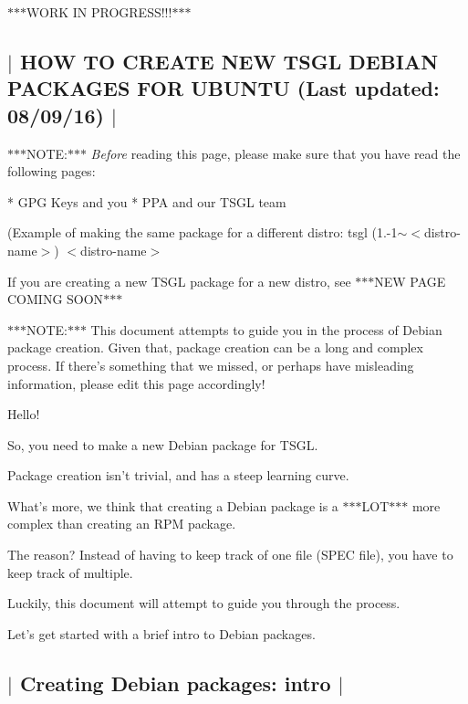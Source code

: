 $\ast$$\ast$$\ast$\-W\-O\-R\-K I\-N P\-R\-O\-G\-R\-E\-S\-S!!!$\ast$$\ast$$\ast$ 

 \subsection*{$\vert$ H\-O\-W T\-O C\-R\-E\-A\-T\-E N\-E\-W T\-S\-G\-L D\-E\-B\-I\-A\-N P\-A\-C\-K\-A\-G\-E\-S F\-O\-R U\-B\-U\-N\-T\-U (Last updated\-: 08/09/16) $\vert$ }

$\ast$$\ast$$\ast$\-N\-O\-T\-E\-:$\ast$$\ast$$\ast$ {\itshape Before} reading this page, please make sure that you have read the following pages\-: \begin{DoxyVerb}* GPG Keys and you
* PPA and our TSGL team
\end{DoxyVerb}


(Example of making the same package for a different distro\-: tsgl (1.-\/1$\sim$$<$distro-\/name$>$) $<$distro-\/name$>$

If you are creating a new T\-S\-G\-L package for a new distro, see $\ast$$\ast$$\ast$\-N\-E\-W P\-A\-G\-E C\-O\-M\-I\-N\-G S\-O\-O\-N$\ast$$\ast$$\ast$

$\ast$$\ast$$\ast$\-N\-O\-T\-E\-:$\ast$$\ast$$\ast$ This document attempts to guide you in the process of Debian package creation. Given that, package creation can be a long and complex process. If there's something that we missed, or perhaps have misleading information, please edit this page accordingly!

Hello!

So, you need to make a new Debian package for T\-S\-G\-L.

Package creation isn't trivial, and has a steep learning curve.

What's more, we think that creating a Debian package is a $\ast$$\ast$$\ast$\-L\-O\-T$\ast$$\ast$$\ast$ more complex than creating an R\-P\-M package.

The reason? Instead of having to keep track of one file (S\-P\-E\-C file), you have to keep track of multiple.

Luckily, this document will attempt to guide you through the process.

Let's get started with a brief intro to Debian packages. 

 \subsection*{$\vert$ Creating Debian packages\-: intro $\vert$ }

